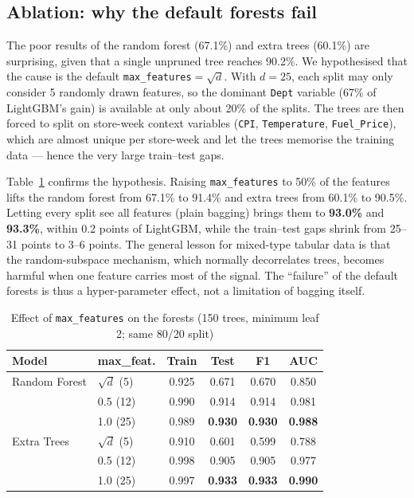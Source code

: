 \subsection{Ablation: why the default forests fail}\label{sec:res:ablation}
The poor results of the random forest (67.1\%) and extra trees (60.1\%) are surprising, given that a single unpruned tree reaches 90.2\%. We hypothesised that the cause is the default \texttt{max\_features}$=\sqrt{d}$. With $d=25$, each split may only consider 5 randomly drawn features, so the dominant \texttt{Dept} variable (67\% of LightGBM's gain) is available at only about 20\% of the splits. The trees are then forced to split on store-week context variables (\texttt{CPI}, \texttt{Temperature}, \texttt{Fuel\_Price}), which are almost unique per store-week and let the trees memorise the training data --- hence the very large train--test gaps.

Table~\ref{tab:ablation} confirms the hypothesis. Raising \texttt{max\_features} to 50\% of the features lifts the random forest from 67.1\% to 91.4\% and extra trees from 60.1\% to 90.5\%. Letting every split see all features (plain bagging) brings them to \textbf{93.0\%} and \textbf{93.3\%}, within 0.2 points of LightGBM, while the train--test gaps shrink from 25--31 points to 3--6 points. The general lesson for mixed-type tabular data is that the random-subspace mechanism, which normally decorrelates trees, becomes harmful when one feature carries most of the signal. The ``failure'' of the default forests is thus a hyper-parameter effect, not a limitation of bagging itself.

\begin{table}[!t]
\caption{Effect of \texttt{max\_features} on the forests (150 trees, minimum leaf 2; same 80/20 split)}
\label{tab:ablation}
\centering
\begin{tabular}{llcccc}
\toprule
Model & max\_feat. & Train & Test & F1 & AUC \\
\midrule
Random Forest & $\sqrt{d}$ (5) & 0.925 & 0.671 & 0.670 & 0.850 \\
 & 0.5 (12) & 0.990 & 0.914 & 0.914 & 0.981 \\
 & 1.0 (25) & 0.989 & \textbf{0.930} & \textbf{0.930} & \textbf{0.988} \\
\midrule
Extra Trees & $\sqrt{d}$ (5) & 0.910 & 0.601 & 0.599 & 0.788 \\
 & 0.5 (12) & 0.998 & 0.905 & 0.905 & 0.977 \\
 & 1.0 (25) & 0.997 & \textbf{0.933} & \textbf{0.933} & \textbf{0.990} \\
\bottomrule
\end{tabular}
\end{table}
